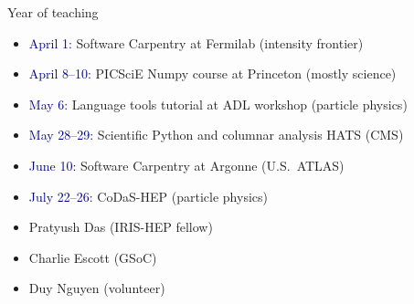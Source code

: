 \documentclass[aspectratio=169]{beamer}
\begin{document}
\begin{frame}{Year of teaching}
\vspace{0.5 cm}
\large

\begin{itemize}\setlength{\itemsep}{0.25 cm}
\item \textcolor{darkblue}{April 1:}     \tabto{2.3 cm}Software Carpentry at Fermilab (intensity frontier)
\item \textcolor{darkblue}{April 8--10:} \tabto{2.3 cm}PICSciE Numpy course at Princeton (mostly science)
\item \textcolor{darkblue}{May 6:}       \tabto{2.3 cm}Language tools tutorial at ADL workshop (particle physics)
\item \textcolor{darkblue}{May 28--29:}  \tabto{2.3 cm}Scientific Python and columnar analysis HATS (CMS)
\item \textcolor{darkblue}{June 10:}     \tabto{2.3 cm}Software Carpentry at Argonne (U.S.\ ATLAS)
\item \textcolor{darkblue}{July 22--26:} \tabto{2.3 cm}CoDaS-HEP (particle physics)
\end{itemize}

\vspace{0.5 cm}
\begin{itemize}
\item Pratyush Das (IRIS-HEP fellow)
\item Charlie Escott (GSoC)
\item Duy Nguyen (volunteer)
\end{itemize}
\end{frame}
\end{document}
